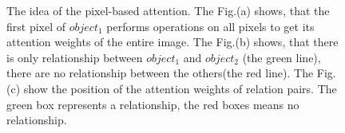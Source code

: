 \begin{figure}[h]
	\caption[The idea of the pixel-based attention]{The idea of the pixel-based attention. The Fig.(a) shows, that the first pixel of $object_1$ performs operations on all pixels to get its attention weights of the entire image. The Fig.(b) shows, that there is only relationship between $object_1$ and $object_2$ (the green line), there are no relationship between the others(the red line). The Fig.(c) show the position of the attention weights of  relation pairs. The green box represents a relationship, the red boxes means no relationship.}
	\label{fig:idea_pixelloss}
\end{figure}


